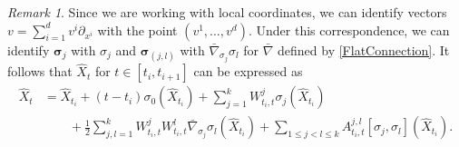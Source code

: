 \documentclass[10pt]{amsart}
\newcounter{dummy} \numberwithin{dummy}{section}
\theoremstyle{remark}
\newtheorem{remark}[dummy]{Remark}
\newcommand{\bfsigma}{\boldsymbol \sigma}
\numberwithin{equation}{section}
\begin{document}
\begin{remark}
Since we are working with local coordinates, we can identify vectors $v = \sum_{i=1}^d v^i \partial_{x^i}$ with the point $(v^1,\dots, v^d)$. Under this correspondence, we can identify $\bfsigma_j$ with $\sigma_j$ and $\bfsigma_{(j,l)}$ with $\bar{\nabla}_{\sigma_j} \sigma_l$ for $\bar\nabla$ defined by \eqref{FlatConnection}. It follows that $\hat X_t$ for $t \in [t_i, t_{i+1}]$ can be expressed as
\begin{align*}
\hat X_t 
&= \hat X_{t_{i}} + (t-t_i) \sigma_0(\hat X_{t_{i}}) + \sum_{j=1}^k W^j_{t_i,t} \sigma_j(\hat X_{t_{i}})  \\
& \qquad + \frac{1}{2} \sum_{j,l=1}^k  W_{t_{i},t}^j W_{t_i,t}^{l} \bar{\nabla}_{\sigma_j} \sigma_{l}(\hat X_{t_{i}})  + \sum_{1\leq j<l\leq k} A^{j,l}_{t_i,t} [\sigma_j, \sigma_l](\hat X_{t_{i}}).
\end{align*}
\end{remark}
\end{document}
